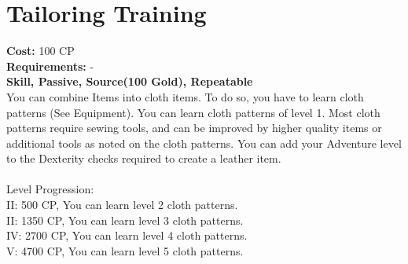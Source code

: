 \section{Tailoring Training}
\textbf{Cost:} 100 CP\\
\textbf{Requirements:} -\\
\textbf{Skill, Passive, Source(100 Gold), Repeatable}\\
You can combine Items into cloth items. To do so, you have to learn cloth patterns (See Equipment). You can learn cloth patterns of level 1. Most cloth patterns require sewing tools, and can be improved by higher quality items or additional tools as noted on the cloth patterns. You can add your Adventure level to the Dexterity checks required to create a leather item.\\
\\
Level Progression:\\
II: 500 CP, You can learn level 2 cloth patterns.\\
II: 1350 CP, You can learn level 3 cloth patterns.\\
IV: 2700 CP, You can learn level 4 cloth patterns.\\
V: 4700 CP, You can learn level 5 cloth patterns.\\